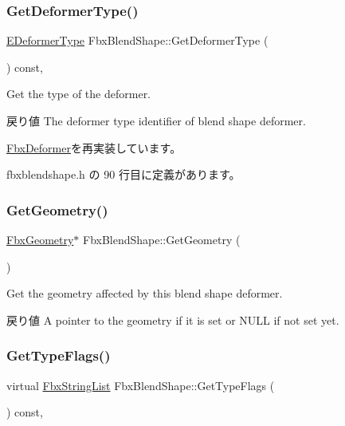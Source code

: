 \subsubsection{\texorpdfstring{Get\+Deformer\+Type()}{GetDeformerType()}}
{\footnotesize\ttfamily \hyperlink{class_fbx_deformer_a07e2cfb767191ba5c8799fdfbfe3eaf6}{E\+Deformer\+Type} Fbx\+Blend\+Shape\+::\+Get\+Deformer\+Type (\begin{DoxyParamCaption}{ }\end{DoxyParamCaption}) const\hspace{0.3cm}{\ttfamily [inline]}, {\ttfamily [virtual]}}

Get the type of the deformer. \begin{DoxyReturn}{戻り値}
The deformer type identifier of blend shape deformer. 
\end{DoxyReturn}


\hyperlink{class_fbx_deformer_adbc586e383f788f24d7fce9ed859d481}{Fbx\+Deformer}を再実装しています。



 fbxblendshape.\+h の 90 行目に定義があります。

\mbox{\label{class_fbx_blend_shape_a2cea3099fb3f8ba5616d1b794371909e}} 
\subsubsection{\texorpdfstring{Get\+Geometry()}{GetGeometry()}}
{\footnotesize\ttfamily \hyperlink{class_fbx_geometry}{Fbx\+Geometry}$\ast$ Fbx\+Blend\+Shape\+::\+Get\+Geometry (\begin{DoxyParamCaption}{ }\end{DoxyParamCaption})}

Get the geometry affected by this blend shape deformer. \begin{DoxyReturn}{戻り値}
A pointer to the geometry if it is set or {\ttfamily N\+U\+LL} if not set yet. 
\end{DoxyReturn}
\mbox{\label{class_fbx_blend_shape_aa2b22b70c929ac1ad39b12f0ade998d1}} 
\subsubsection{\texorpdfstring{Get\+Type\+Flags()}{GetTypeFlags()}}
{\footnotesize\ttfamily virtual \hyperlink{class_fbx_string_list}{Fbx\+String\+List} Fbx\+Blend\+Shape\+::\+Get\+Type\+Flags (\begin{DoxyParamCaption}{ }\end{DoxyParamCaption}) const\hspace{0.3cm}{\ttfamily [protected]}, {\ttfamily [virtual]}}



